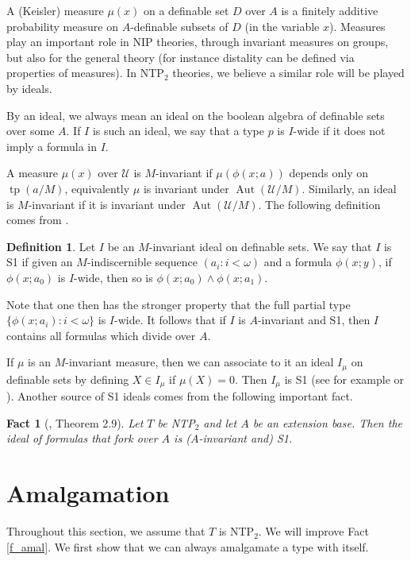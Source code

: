 \documentclass{amsart}
\numberwithin{equation}{section}
\newtheorem{fait}[thm]{Fact}
\theoremstyle{definition}
\newtheorem{defi}[thm]{Definition}
\theoremstyle{mystyle}
\theoremstyle{remark}
\newcommand{\monster}{\mathcal U}
\DeclareMathOperator{\tp}{tp}
\DeclareMathOperator{\Aut}{Aut}
\begin{document}
A (Keisler) measure $\mu(x)$ on a definable set $D$ over $A$ is a finitely additive probability measure on $A$-definable subsets of $D$ (in the variable $x$). Measures play an important role in NIP theories, through invariant measures on groups, but also for the general theory (for instance distality can be defined via properties of measures). In NTP$_2$ theories, we believe a similar role will be played by ideals.

By an ideal, we always mean an ideal on the boolean algebra of definable sets over some $A$. If $I$ is such an ideal, we say that a type $p$ is $I$-wide if it does not imply a formula in $I$.

A measure $\mu(x)$ over $\monster$ is $M$-invariant if $\mu(\phi(x;a))$ depends only on $\tp(a/M)$, equivalently $\mu$ is invariant under $\Aut(\monster/M)$. Similarly, an ideal is $M$-invariant if it is invariant under $\Aut(\monster/M)$. The following definition comes from \cite{hr_appr}.

\begin{defi}
Let $I$ be an $M$-invariant ideal on definable sets. We say that $I$ is S1 if given an $M$-indiscernible sequence $(a_i:i<\omega)$ and a formula $\phi(x;y)$, if $\phi(x;a_0)$ is $I$-wide, then so is $\phi(x;a_0)\wedge \phi(x;a_1)$.
\end{defi}

Note that one then has the stronger property that the full partial type $\{\phi(x;a_i):i<\omega\}$ is $I$-wide. It follows that if $I$ is $A$-invariant and S1, then $I$ contains all formulas which divide over $A$.


If $\mu$ is an $M$-invariant measure, then we can associate to it an ideal $I_\mu$ on definable sets by defining $X\in I_\mu$ if $\mu(X)=0$. Then $I_\mu$ is S1 (see for example \cite{hr_appr} or \cite[Lemma 7.5]{NIPbook}). Another source of S1 ideals comes from the following important fact.

\begin{fait}[\cite{CherBY}, Theorem 2.9]\label{fact_s1}
Let $T$ be NTP$_2$ and let $A$ be an extension base. Then the ideal of formulas that fork over $A$ is ($A$-invariant and) S1.
\end{fait}

\section{Amalgamation}

Throughout this section, we assume that $T$ is NTP$_2$. We will improve Fact \ref{f_amal}. We first show that we can always amalgamate a type with itself.
\end{document}
